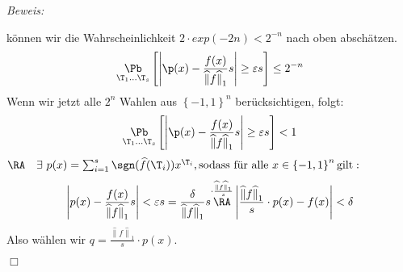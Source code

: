 \documentclass{article}
\newenvironment{proof}{
	\textit{Beweis: \\}
}{
	\begin{flushright}
		$\Box$ 
	\end{flushright}
}
\begin{document}
\begin{satz}
\begin{proof}
		k\"onnen wir die Wahrscheinlichkeit $ 2 \cdot exp(-2n) <2^{-n}$ nach oben absch\"atzen.
		\[
					\underset{{\T_1 \dots \T_s }}{\Pb} \left[\left| \p (x) - \frac{f(x)}{{ \widehat{\lVert} f \widehat{\rVert} }_1}s  \right| \geq \varepsilon s \right] \leq 2^{-n}
		\]
		Wenn wir jetzt alle $ 2^n$ Wahlen aus $ \left\lbrace -1,1 \right\rbrace^n $ ber\"ucksichtigen, folgt:\\
		\[
			 \underset{{\T_1 \dots \T_s }}{\Pb} \left[\left| \p (x) - \frac{f(x)}{{ \widehat{\lVert} f \widehat{\rVert} }_1}s  \right| \geq \varepsilon s \right] <1 
		\]
		$\RA \quad \exists \ p(x)=\sum_{i=1}^s \sgn (\widehat{f}(\T_i))x^{\T_i} ,\text{sodass f\"ur alle} \ x \in \left\lbrace -1,1 \right\rbrace^n \text{gilt} :$
		\[	\left|p(x) - \frac{f(x)}{{ \widehat{\lVert} f \widehat{\rVert} }_1}s \right|	< \varepsilon s  =\frac{\delta}{{ \widehat{\lVert} f \widehat{\rVert} }_1}  s 
			\overset{\cdot \frac{{ \widehat{\lVert} f \widehat{\rVert} }_1}{s} }{ \RA } \left| \frac{{ \widehat{\lVert} f \widehat{\rVert} }_1}{s} \cdot p(x) -f(x) \right| < \delta 		\]
		Also w\"ahlen wir $q=  \frac{{ \widehat{\lVert} f\widehat{\rVert} }_1}{s} \cdot p(x) $.
	 \end{proof}
	 	\end{satz}
\end{document}
